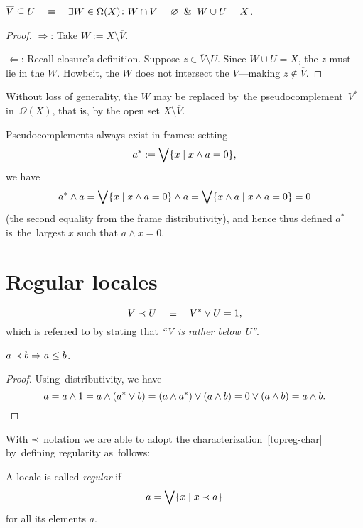 \begin{lem} \label{lem:rb-char}
  $\overline{V}\subseteq U \quad \equiv \quad \exists W\in \Omega(X)\colon W \cap V =
  \varnothing \;\; \& \;\; W \cup U = X$.
\end{lem}
\begin{proof}
  $\Rightarrow$:
  Take $W := X\setminus \overline{V}$.

  $\Leftarrow$:
  Recall closure's definition.
  Suppose $z\in \overline{V}\setminus U$.
  Since $W \cup U = X$, the $z$ must lie in the $W$.
  Howbeit, the $W$ does not intersect the $V$---making $z\not\in \overline{V}$.
\end{proof}

Without loss of generality, the $W$ may be replaced by~the
pseudocomplement~$V^*$ in~$\Omega(X)$, that is, by the open set $X\setminus
\overline{V}$.

\begin{rem}
Pseudocomplements always exist in frames:
setting
\[
  a^* := \bigvee \{x \mid x \wedge a = 0\},
\]
we have
\[
  a^* \wedge a = \bigvee \{x \mid x \wedge a = 0\} \wedge a = \bigvee \{x \wedge
  a \mid x \wedge a = 0\} = 0
\]
(the second equality from the frame distributivity), and hence thus defined
$a^*$ is~the~largest $x$ such that $a \wedge x = 0$.
\end{rem}

\section{Regular locales}

\begin{framed}
  \begin{nota}[$\rb$]
    \[
      V \prec U \quad \equiv \quad V^* \vee U = 1,
    \]
    which is referred to by stating that \emph{``V is rather below U''\/}.
  \end{nota}
\end{framed}

\begin{lem} \label{rb->leq}
  $a \prec b \Rightarrow a \leq b$.
\end{lem}
\begin{proof}
  Using~distributivity, we have
  \[
    a = a \wedge 1 = a \wedge (a^* \vee b) = (a \wedge a^*) \vee (a \wedge b) =
    0 \vee (a \wedge b) = a \wedge b. \qedhere
  \]
\end{proof}

With $\rb$ notation we are able to adopt the characterization~\ref{topreg-char}
by~defining regularity as~follows:
\begin{framed}
  \begin{df}[Reg]
    A locale is called \emph{regular\/} if
    \[
      a = \bigvee \{x \mid x \prec a\}
    \]
    for all its elements $a$.
  \end{df}
\end{framed}

